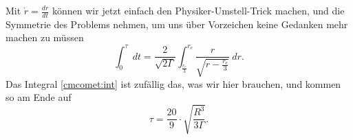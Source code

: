 \begin{Answer}[ref = cmcomet]
\begin{equation*}
	\end{equation*}
	Mit $\dot{r} = \frac{dr}{dt}$ können wir jetzt einfach den Physiker-Umstell-Trick machen, und die Symmetrie des Problems nehmen, um uns über Vorzeichen keine Gedanken mehr machen zu müssen
	\begin{equation*}
		\int_0^\tau ~dt = \frac{2}{\sqrt{2\Gamma}}\int_{\frac{r_e}{3}}^{r_e} \frac{r}{\sqrt{r- \frac{r_e}{3}}}~dr.
	\end{equation*}
	Das Integral \eqref{cmcomet:int} ist zufällig das, was wir hier brauchen, und kommen so am Ende auf
	\begin{equation*}
		\boxed{\tau = \frac{20}{9} \cdot \sqrt{\frac{R^3}{3\Gamma}}.} 
	\end{equation*}
\end{Answer}